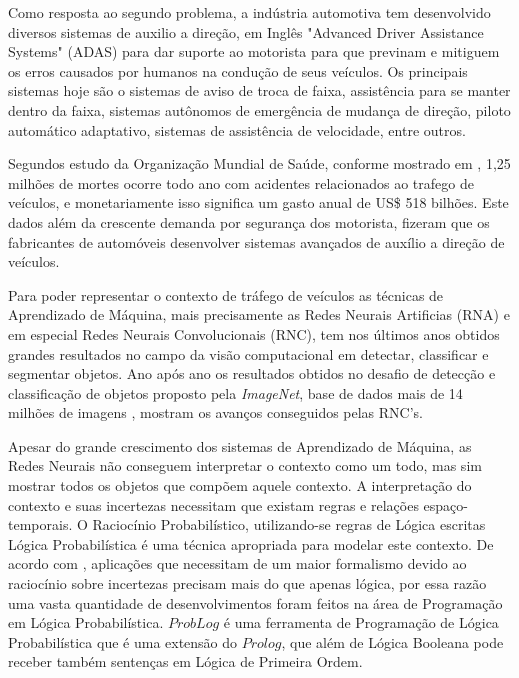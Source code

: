 \documentclass[
	12pt,				%
    oneside,			%
	a4paper,			%
	english,			%
	french,				%
	spanish,			%
	brazil,				%
	]{abntex2}
\begin{document}
Como resposta ao segundo problema, a indústria automotiva tem desenvolvido diversos sistemas de auxilio a direção, em Inglês "Advanced Driver Assistance Systems" (ADAS) para dar suporte ao motorista para que previnam e mitiguem os erros causados por humanos na condução de seus veículos. Os principais sistemas hoje são o sistemas de aviso de troca de faixa, assistência para se manter dentro da faixa, sistemas autônomos de emergência de mudança de direção, piloto automático adaptativo, sistemas de assistência de velocidade, entre outros. 

Segundos estudo da Organização Mundial de Saúde, conforme mostrado em , 1,25 milhões de mortes ocorre todo ano com acidentes relacionados ao trafego de veículos, e monetariamente isso significa um gasto anual de  US\$ 518 bilhões. Este dados além da crescente demanda por segurança dos motorista, fizeram que os fabricantes de automóveis desenvolver sistemas avançados de auxílio a direção de veículos. 

Para poder representar o contexto de tráfego de veículos as técnicas de Aprendizado de Máquina, mais precisamente as Redes Neurais Artificias (RNA) e em especial Redes Neurais Convolucionais (RNC), tem nos últimos anos obtidos grandes resultados no campo da visão computacional em detectar, classificar e segmentar objetos. Ano após ano os resultados obtidos no desafio de detecção e classificação de objetos proposto pela \textit{ImageNet}, base de dados mais de 14 milhões de imagens , mostram os avanços conseguidos pelas RNC's.

Apesar do grande crescimento dos sistemas de Aprendizado de Máquina, as Redes Neurais não conseguem interpretar o contexto como um todo, mas sim mostrar todos os objetos que compõem aquele contexto. A interpretação do contexto e suas incertezas necessitam que existam  regras e relações espaço-temporais. O Raciocínio Probabilístico, utilizando-se regras de Lógica escritas Lógica Probabilística é uma técnica apropriada para modelar este contexto. De acordo com , aplicações que necessitam de um maior formalismo devido ao raciocínio sobre incertezas precisam mais do que apenas lógica, por essa razão uma vasta quantidade de desenvolvimentos foram feitos na área de Programação em Lógica Probabilística. $ProbLog$ é uma ferramenta de Programação de Lógica Probabilística que é uma extensão do $Prolog$, que além de Lógica Booleana pode receber também sentenças em Lógica de Primeira Ordem.
\end{document}
